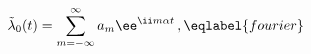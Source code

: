 \begin{equation}
\tilde\lambda_0 (t) = \sum_{m=-\infty}^\infty a_m \ee^{\ii m\alpha t} \,,
\eqlabel{fourier}
\end{equation}

